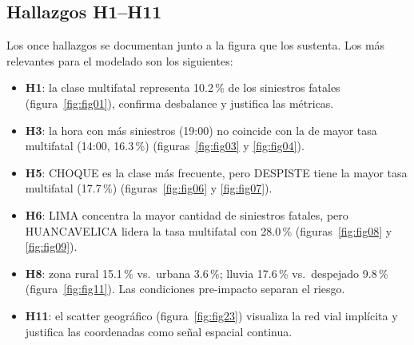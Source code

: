 \subsection{Hallazgos H1--H11}
Los once hallazgos se documentan junto a la figura que los sustenta. Los más relevantes para el modelado son los siguientes:
\begin{itemize}
  \item \textbf{H1}: la clase multifatal representa 10.2\,\% de los siniestros fatales (figura~\ref{fig:fig01}), confirma desbalance y justifica las métricas.
  \item \textbf{H3}: la hora con más siniestros (19:00) no coincide con la de mayor tasa multifatal (14:00, 16.3\,\%) (figuras~\ref{fig:fig03} y \ref{fig:fig04}).
  \item \textbf{H5}: CHOQUE es la clase más frecuente, pero DESPISTE tiene la mayor tasa multifatal (17.7\,\%) (figuras~\ref{fig:fig06} y \ref{fig:fig07}).
  \item \textbf{H6}: LIMA concentra la mayor cantidad de siniestros fatales, pero HUANCAVELICA lidera la tasa multifatal con 28.0\,\% (figuras~\ref{fig:fig08} y \ref{fig:fig09}).
  \item \textbf{H8}: zona rural 15.1\,\% vs.\ urbana 3.6\,\%; lluvia 17.6\,\% vs.\ despejado 9.8\,\% (figura~\ref{fig:fig11}). Las condiciones pre-impacto separan el riesgo.
  \item \textbf{H11}: el scatter geográfico (figura~\ref{fig:fig23}) visualiza la red vial implícita y justifica las coordenadas como señal espacial continua.
\end{itemize}